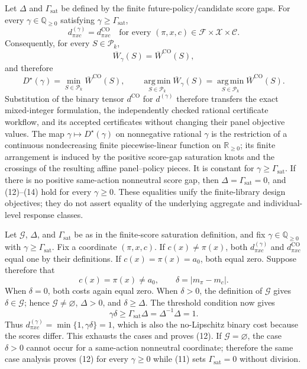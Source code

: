 Let \(\Delta\) and \(\Gamma_{\mathrm{sat}}\) be defined by the finite
future-policy/candidate score gaps.  For every
\(\gamma\in\mathbb Q_{\geq0}\) satisfying
\(\gamma\geq\Gamma_{\mathrm{sat}}\),
\[
d^{(\gamma)}_{\pi xc}=d^{\mathrm{CO}}_{\pi xc}
\quad\text{for every }(\pi,x,c)\in
\mathcal F\times\mathcal X\times\mathcal C.                       \tag{12}
\]
Consequently, for every \(S\in\mathcal P_k\),
\[
\overline W_\gamma(S)=\overline W^{\mathrm{CO}}(S),                \tag{13}
\]
and therefore
\[
D^\star(\gamma)=\min_{S\in\mathcal P_k}\overline W^{\mathrm{CO}}(S),
\qquad
\operatorname*{arg\,min}_{S\in\mathcal P_k}\overline W_\gamma(S)
=\operatorname*{arg\,min}_{S\in\mathcal P_k}
\overline W^{\mathrm{CO}}(S).                                      \tag{14}
\]
Substitution of the binary tensor \(d^{\mathrm{CO}}\) for
\(d^{(\gamma)}\) therefore transfers the exact mixed-integer formulation,
the independently checked rational certificate workflow, and its accepted
certificates without changing their panel objective values.  The map
\(\gamma\mapsto D^\star(\gamma)\) on nonnegative rational \(\gamma\) is
the restriction of a continuous nondecreasing finite piecewise-linear
function on \(\mathbb R_{\geq0}\); its finite arrangement is induced by
the positive score-gap saturation knots and the crossings of the resulting
affine panel--policy pieces.  It is constant for
\(\gamma\geq\Gamma_{\mathrm{sat}}\).  If there is no positive same-action
nonneutral score gap, then \(\Delta=\Gamma_{\mathrm{sat}}=0\), and
(12)--(14) hold for every \(\gamma\geq0\).  These equalities unify the
finite-library design objectives; they do not assert equality of the
underlying aggregate and individual-level response classes.

Let \(\mathcal G\), \(\Delta\), and \(\Gamma_{\mathrm{sat}}\) be as in
the finite-score saturation definition, and fix
\(\gamma\in\mathbb Q_{\geq0}\) with
\(\gamma\geq\Gamma_{\mathrm{sat}}\).  Fix a coordinate
\((\pi,x,c)\).  If \(c(x)\neq\pi(x)\), both
\(d^{(\gamma)}_{\pi xc}\) and \(d^{\mathrm{CO}}_{\pi xc}\) equal one
by their definitions.  If \(c(x)=\pi(x)=a_0\), both equal zero.  Suppose
therefore that
\[
c(x)=\pi(x)\neq a_0,
\qquad \delta=|m_\pi-m_c|.
\]
When \(\delta=0\), both costs again equal zero.  When \(\delta>0\), the
definition of \(\mathcal G\) gives \(\delta\in\mathcal G\); hence
\(\mathcal G\neq\varnothing\), \(\Delta>0\), and
\(\delta\geq\Delta\).  The threshold condition now gives
\[
\gamma\delta\geq \Gamma_{\mathrm{sat}}\Delta
=\Delta^{-1}\Delta=1.
\]
Thus \(d^{(\gamma)}_{\pi xc}=\min\{1,\gamma\delta\}=1\), which is also
the no-Lipschitz binary cost because the scores differ.  This exhausts the
cases and proves (12).  If \(\mathcal G=\varnothing\), the case
\(\delta>0\) cannot occur for a same-action nonneutral coordinate;
therefore the same case analysis proves (12) for every \(\gamma\geq0\)
while (11) sets \(\Gamma_{\mathrm{sat}}=0\) without division.

